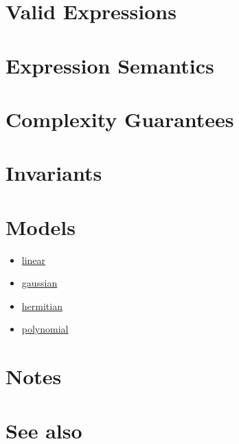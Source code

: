 \documentclass{article}
\begin{document}
\section*{Valid Expressions}
\section*{Expression Semantics}
\section*{Complexity Guarantees}
\section*{Invariants}
\section*{Models}

\begin{itemize}
\item \href{\kmlroot/linear.html}{linear}
\item \href{\kmlroot/gaussian.html}{gaussian}
\item \href{\kmlroot/hermitian.html}{hermitian}
\item \href{\kmlroot/polynomial.html}{polynomial}
\end{itemize}

\section*{Notes}
\section*{See also}




\end{document}
